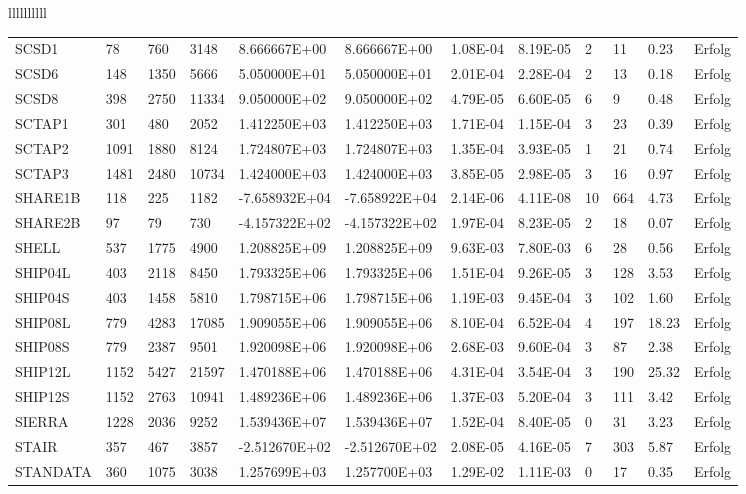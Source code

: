 \begin{tabular}{llllllllll}
\begin{tabular}{llllllllllll}
SCSD1 & 78 & 760 & 3148 & 8.666667E+00 & 8.666667E+00 & 1.08E-04 & 8.19E-05 & 2 & 11 & 0.23 & Erfolg \\
SCSD6 & 148 & 1350 & 5666 & 5.050000E+01 & 5.050000E+01 & 2.01E-04 & 2.28E-04 & 2 & 13 & 0.18 & Erfolg \\
SCSD8 & 398 & 2750 & 11334 & 9.050000E+02 & 9.050000E+02 & 4.79E-05 & 6.60E-05 & 6 & 9 & 0.48 & Erfolg \\
SCTAP1 & 301 & 480 & 2052 & 1.412250E+03 & 1.412250E+03 & 1.71E-04 & 1.15E-04 & 3 & 23 & 0.39 & Erfolg \\
SCTAP2 & 1091 & 1880 & 8124 & 1.724807E+03 & 1.724807E+03 & 1.35E-04 & 3.93E-05 & 1 & 21 & 0.74 & Erfolg \\
SCTAP3 & 1481 & 2480 & 10734 & 1.424000E+03 & 1.424000E+03 & 3.85E-05 & 2.98E-05 & 3 & 16 & 0.97 & Erfolg \\
SHARE1B & 118 & 225 & 1182 & -7.658932E+04 & -7.658922E+04 & 2.14E-06 & 4.11E-08 & 10 & 664 & 4.73 & Erfolg \\
SHARE2B & 97 & 79 & 730 & -4.157322E+02 & -4.157322E+02 & 1.97E-04 & 8.23E-05 & 2 & 18 & 0.07 & Erfolg \\
SHELL & 537 & 1775 & 4900 & 1.208825E+09 & 1.208825E+09 & 9.63E-03 & 7.80E-03 & 6 & 28 & 0.56 & Erfolg \\
SHIP04L & 403 & 2118 & 8450 & 1.793325E+06 & 1.793325E+06 & 1.51E-04 & 9.26E-05 & 3 & 128 & 3.53 & Erfolg \\
SHIP04S & 403 & 1458 & 5810 & 1.798715E+06 & 1.798715E+06 & 1.19E-03 & 9.45E-04 & 3 & 102 & 1.60 & Erfolg \\
SHIP08L & 779 & 4283 & 17085 & 1.909055E+06 & 1.909055E+06 & 8.10E-04 & 6.52E-04 & 4 & 197 & 18.23 & Erfolg \\
SHIP08S & 779 & 2387 & 9501 & 1.920098E+06 & 1.920098E+06 & 2.68E-03 & 9.60E-04 & 3 & 87 & 2.38 & Erfolg \\
SHIP12L & 1152 & 5427 & 21597 & 1.470188E+06 & 1.470188E+06 & 4.31E-04 & 3.54E-04 & 3 & 190 & 25.32 & Erfolg \\
SHIP12S & 1152 & 2763 & 10941 & 1.489236E+06 & 1.489236E+06 & 1.37E-03 & 5.20E-04 & 3 & 111 & 3.42 & Erfolg \\
SIERRA & 1228 & 2036 & 9252 & 1.539436E+07 & 1.539436E+07 & 1.52E-04 & 8.40E-05 & 0 & 31 & 3.23 & Erfolg \\
STAIR & 357 & 467 & 3857 & -2.512670E+02 & -2.512670E+02 & 2.08E-05 & 4.16E-05 & 7 & 303 & 5.87 & Erfolg \\
STANDATA & 360 & 1075 & 3038 & 1.257699E+03 & 1.257700E+03 & 1.29E-02 & 1.11E-03 & 0 & 17 & 0.35 & Erfolg \\

\end{tabular}
\end{tabular}
